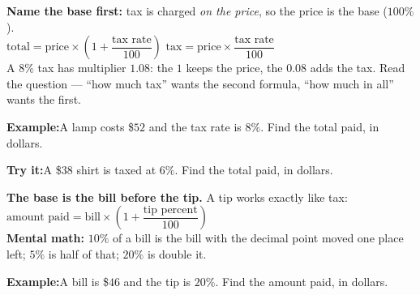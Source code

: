 \documentclass[12pt]{article}
\begin{document}


\begin{formulabox}
\textbf{Name the base first:} tax is charged \emph{on the price}, so the price is
the base ($100\%$).\\[3pt]
$\text{total} = \text{price} \times \left(1 + \dfrac{\text{tax rate}}{100}\right)$
\qquad $\text{tax} = \text{price} \times \dfrac{\text{tax rate}}{100}$\\[3pt]
A $8\%$ tax has multiplier $1.08$: the $1$ keeps the price, the $0.08$ adds the
tax. Read the question --- ``how much tax'' wants the second formula, ``how much
in all'' wants the first.
\end{formulabox}

\begin{examplebox}
\textbf{Example:}\quad A lamp costs \$$52$ and the tax rate is $8\%$. Find the
total paid, in dollars.
\end{examplebox}

\begin{tryitbox}
\textbf{Try it:}\quad A \$$38$ shirt is taxed at $6\%$. Find the total paid, in
dollars.\\[2pt]
\end{tryitbox}


\begin{formulabox}
\textbf{The base is the bill before the tip.} A tip works exactly like tax:\\[3pt]
$\text{amount paid} = \text{bill} \times \left(1 + \dfrac{\text{tip percent}}{100}\right)$\\[3pt]
\textbf{Mental math:} $10\%$ of a bill is the bill with the decimal point moved
one place left; $5\%$ is half of that; $20\%$ is double it.
\end{formulabox}

\begin{examplebox}
\textbf{Example:}\quad A bill is \$$46$ and the tip is $20\%$. Find the amount
paid, in dollars.
\end{examplebox}
\end{document}
